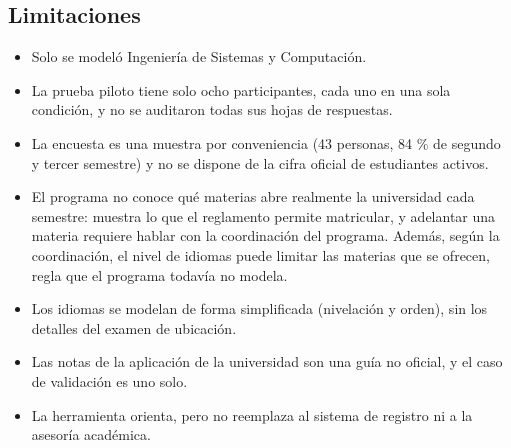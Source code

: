 \documentclass[11pt,a4paper]{article}
\begin{document}
\subsection{Limitaciones}
\begin{itemize}
  \item Solo se modeló Ingeniería de Sistemas y Computación.
  \item La prueba piloto tiene solo ocho participantes, cada uno en una sola condición, y no se auditaron todas sus hojas de respuestas.
  \item La encuesta es una muestra por conveniencia (43 personas, 84 \% de segundo y tercer semestre) y no se dispone de la cifra oficial de estudiantes activos.
  \item El programa no conoce qué materias abre realmente la universidad cada semestre: muestra lo que el reglamento permite matricular, y adelantar una materia requiere hablar con la coordinación del programa. Además, según la coordinación, el nivel de idiomas puede limitar las materias que se ofrecen, regla que el programa todavía no modela.
  \item Los idiomas se modelan de forma simplificada (nivelación y orden), sin los detalles del examen de ubicación.
  \item Las notas de la aplicación de la universidad son una guía no oficial, y el caso de validación es uno solo.
  \item La herramienta orienta, pero no reemplaza al sistema de registro ni a la asesoría académica.
\end{itemize}

\printbibliography[title=Referencias]
\end{document}
